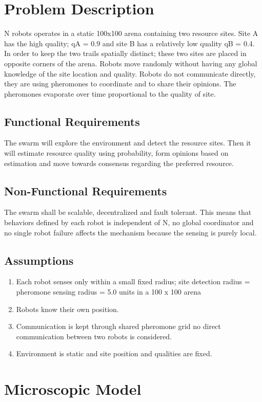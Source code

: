 \documentclass{article}
\begin{document}
\section{Problem Description}
N robots operates in a static 100x100 arena containing two resource sites. Site A has the high quality; qA = 0.9 and site B has a relatively low quality qB = 0.4. In order to keep the two trails spatially distinct; these two sites are placed in opposite corners of the arena. Robots move randomly without having any global knowledge of the site location and quality. Robots do not communicate directly, they are using pheromones to coordinate and to share their opinions. The pheromones evaporate over time proportional to the quality of site.
\subsection{Functional Requirements}
The swarm will explore the environment and detect the resource sites. Then it will estimate resource quality using probability, form opinions based on estimation and move towards consensus regarding the preferred resource. 
\subsection{Non-Functional Requirements}
The swarm shall be scalable, decentralized and fault tolerant. This means that behaviors defined by each robot is independent of N, no global coordinator and no single robot failure affects the mechanism because the sensing is purely local. 
\subsection{Assumptions}
\begin{enumerate}
    \item Each robot senses only within a small fixed radius; site detection 
    radius = pheromone sensing radius = 5.0 units in a 100 x 100 arena
    \item Robots know their own position.
    \item Communication is kept through shared pheromone grid no direct communication between two robots is considered. 
    \item Environment is static and site position and qualities are fixed.
\end{enumerate}
\section{Microscopic Model}
\end{document}
